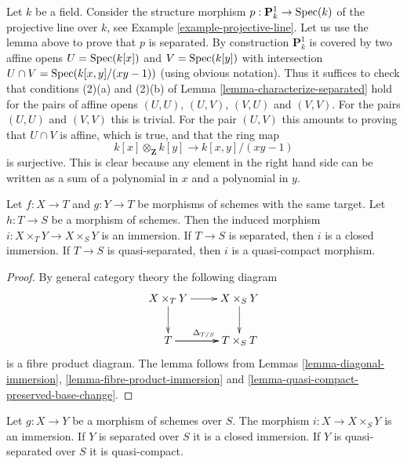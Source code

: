 \begin{example}
\label{example-projective-line-separated}
Let $k$ be a field. Consider the structure morphism
$p : \mathbf{P}^1_k \to \mathop{\rm Spec}(k)$ of the projective
line over $k$, see Example \ref{example-projective-line}.
Let us use the lemma above to prove that $p$
is separated. By construction $\mathbf{P}^1_k$ is covered by two
affine opens $U = \mathop{\rm Spec}(k[x])$ and $V = \mathop{\rm Spec}(k[y])$
with intersection $U \cap V = \mathop{\rm Spec}(k[x, y]/(xy - 1))$
(using obvious notation). Thus it suffices to check that
conditions (2)(a) and (2)(b) of Lemma \ref{lemma-characterize-separated}
hold for the pairs of affine opens $(U, U)$, $(U, V)$, $(V, U)$
and $(V, V)$. For the pairs $(U, U)$ and $(V, V)$ this is trivial.
For the pair $(U, V)$ this amounts to proving
that $U \cap V$ is affine, which is true, and that the ring map
$$
k[x] \otimes_{\mathbf{Z}} k[y] \longrightarrow k[x, y]/(xy - 1)
$$
is surjective. This is clear because any element in the
right hand side can be written as a sum of a polynomial
in $x$ and a polynomial in $y$.
\end{example}

\begin{lemma}
\label{lemma-fibre-product-after-map}
Let $f : X \to T$ and $g : Y \to T$ be morphisms of schemes
with the same target. Let $h : T \to S$ be a morphism of schemes.
Then the induced morphism $i : X \times_T Y \to X \times_S Y$ is
an immersion. If $T \to S$ is separated, then $i$ is a closed
immersion. If $T \to S$ is quasi-separated, then $i$ is a
quasi-compact morphism.
\end{lemma}

\begin{proof}
By general category theory the following diagram
$$
\xymatrix{
X \times_T Y \ar[r] \ar[d] & X \times_S Y \ar[d] \\
T \ar[r]^{\Delta_{T/S}} \ar[r] & T \times_S T
}
$$
is a fibre product diagram. The lemma follows
from Lemmas \ref{lemma-diagonal-immersion},
\ref{lemma-fibre-product-immersion} and
\ref{lemma-quasi-compact-preserved-base-change}.
\end{proof}

\begin{lemma}
\label{lemma-semi-diagonal}
Let $g : X \to Y$ be a morphism of schemes over $S$.
The morphism $i : X \to X \times_S Y$ is an immersion.
If $Y$ is separated over $S$ it is a closed immersion.
If $Y$ is quasi-separated over $S$ it is quasi-compact.
\end{lemma}

